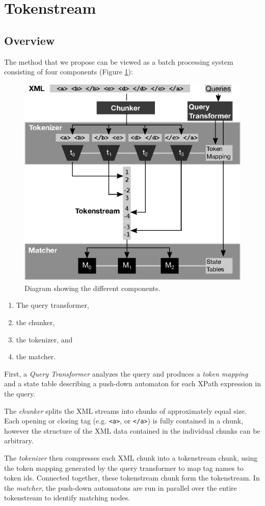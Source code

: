 \section{Tokenstream}\label{sec:yourmethod}


\subsection{Overview}

The method that we propose can be viewed as a batch processing system consisting
of four components (Figure \ref{fig:methodoverview}):

\begin{figure}[tb]\centering
	\includegraphics[width=.5\textwidth]{img/methodoverview.eps}
  \caption{Diagram showing the different components.\label{fig:methodoverview}}
\end{figure}

\begin{enumerate}
\item The query transformer, \item the chunker, \item the tokenizer, and \item the matcher.
\end{enumerate}

First, a \emph{Query Transformer} analyzes the query and produces a \emph{token
mapping} and a state table describing a push-down automaton for each XPath
expression in the query.

The \emph{chunker} splits the XML streams into chunks of approximately equal
size. Each opening or closing tag (e.g. \verb;<a>;, or \verb;</a>;) is fully
contained in a chunk, however the structure of the XML data contained in the
individual chunks can be arbitrary.

The \emph{tokenizer} then compresses each XML chunk into a tokenstream chunk,
using the token mapping generated by the query transformer to map tag names to
token ids. Connected together, these tokenstream chunk form the tokenstream. In
the \emph{matcher}, the push-down automatons are run in parallel over the
entire tokenstream to identify matching nodes.

